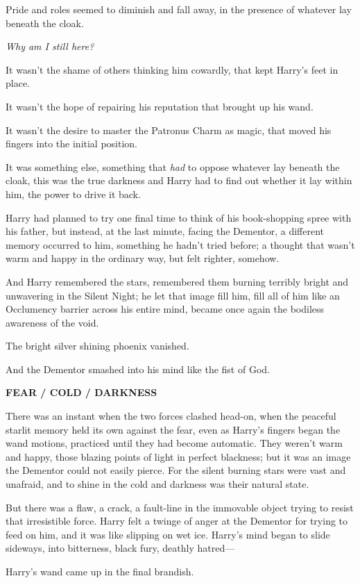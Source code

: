 Pride and roles seemed to diminish and fall away, in the presence of
whatever lay beneath the cloak.

\emph{Why am I still here?}

It wasn't the shame of others thinking him cowardly, that kept Harry's
feet in place.

It wasn't the hope of repairing his reputation that brought up his wand.

It wasn't the desire to master the Patronus Charm as magic, that moved
his fingers into the initial position.

It was something else, something that \emph{had} to oppose whatever lay
beneath the cloak, this was the true darkness and Harry had to find out
whether it lay within him, the power to drive it back.

Harry had planned to try one final time to think of his book-shopping
spree with his father, but instead, at the last minute, facing the
Dementor, a different memory occurred to him, something he hadn't tried
before; a thought that wasn't warm and happy in the ordinary way, but
felt righter, somehow.

And Harry remembered the stars, remembered them burning terribly bright
and unwavering in the Silent Night; he let that image fill him, fill all
of him like an Occlumency barrier across his entire mind, became once
again the bodiless awareness of the void.

The bright silver shining phoenix vanished.

And the Dementor smashed into his mind like the fist of God.

\textbf{FEAR / COLD / DARKNESS}

There was an instant when the two forces clashed head-on, when the
peaceful starlit memory held its own against the fear, even as Harry's
fingers began the wand motions, practiced until they had become
automatic. They weren't warm and happy, those blazing points of light in
perfect blackness; but it was an image the Dementor could not easily
pierce. For the silent burning stars were vast and unafraid, and to
shine in the cold and darkness was their natural state.

But there was a flaw, a crack, a fault-line in the immovable object
trying to resist that irresistible force. Harry felt a twinge of anger
at the Dementor for trying to feed on him, and it was like slipping on
wet ice. Harry's mind began to slide sideways, into bitterness, black
fury, deathly hatred---

Harry's wand came up in the final brandish.

